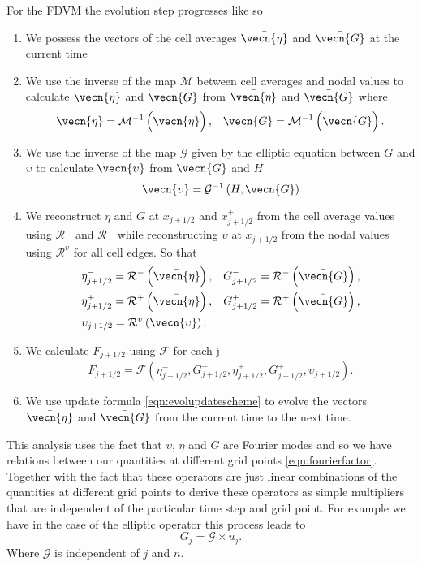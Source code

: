 For the FDVM the evolution step progresses like so
\begin{enumerate}
	\item We possess the vectors of the cell averages $\bar{\vecn{\eta}}$ and $\bar{\vecn{G}}$ at the current time
	\item We use the inverse of the map $\mathcal{M}$ between cell averages and nodal values to calculate ${\vecn{\eta}}$ and ${\vecn{G}}$ from $\bar{\vecn{\eta}}$ and $\bar{\vecn{G}}$ where
	\begin{align*}
	&{\vecn{\eta}} = \mathcal{M}^{-1}\left(\bar{\vecn{\eta}} \right), 
	&{\vecn{G}} = \mathcal{M}^{-1}\left(\bar{\vecn{G}} \right). 
	\end{align*}
	\item We use the inverse of the map $\mathcal{G}$ given by the elliptic equation  between $G$ and $\upsilon$ to calculate ${\vecn{\upsilon}}$ from ${\vecn{G}}$ and $H$
	\[{\vecn{\upsilon}} = \mathcal{G}^{-1}\left(H, {\vecn{G}}\right)\]
	\item We reconstruct $\eta$ and $G$ at $x^-_{j+1/2}$ and $x^+_{j+1/2}$ from the cell average values using $\mathcal{R}^{-}$ and $\mathcal{R}^{+}$ while reconstructing $\upsilon$ at $x_{j+1/2}$ from the nodal values using $\mathcal{R}^{\upsilon}$ for all cell edges. So that
	\begin{align*}
	&\eta^-_{j+1/2} = \mathcal{R}^{-}\left(\bar{\vecn{\eta}}\right),  &G^-_{j+1/2} = \mathcal{R}^{-}\left(\bar{\vecn{G}}\right), \\
	&\eta^+_{j+1/2} = \mathcal{R}^{+}\left(\bar{\vecn{\eta}}\right),  &G^+_{j+1/2} = \mathcal{R}^{+}\left(\bar{\vecn{G}}\right), \\
	&\upsilon_{j+1/2} = \mathcal{R}^{\upsilon}\left({\vecn{\upsilon}}\right).
	\end{align*}
	\item We calculate $F_{j+1/2}$ using $\mathcal{F}$ for each j
	\[F_{j+1/2} =\mathcal{F} \left(\eta^-_{j+1/2}, G^-_{j+1/2},\eta^+_{j+1/2}, G^+_{j+1/2},\upsilon_{j+1/2}  \right). \]
	\item We use update formula \eqref{eqn:evolupdatescheme} to evolve the vectors $\bar{\vecn{\eta}}$ and $\bar{\vecn{G}}$ from the current time to the next time.
\end{enumerate}

This analysis uses the fact that $\upsilon$, $\eta$ and $G$ are Fourier modes and so we have relations between our quantities at different grid points \eqref{eqn:fourierfactor}. Together with the fact that these operators are just linear combinations of the quantities at different grid points to derive these operators as simple multipliers that are independent of the particular time step and grid point.
For example we have in the case of the elliptic operator this process leads to
\[G_j = \mathcal{G} \times u_j.\]
Where $\mathcal{G}$ is independent of $j$ and $n$.

